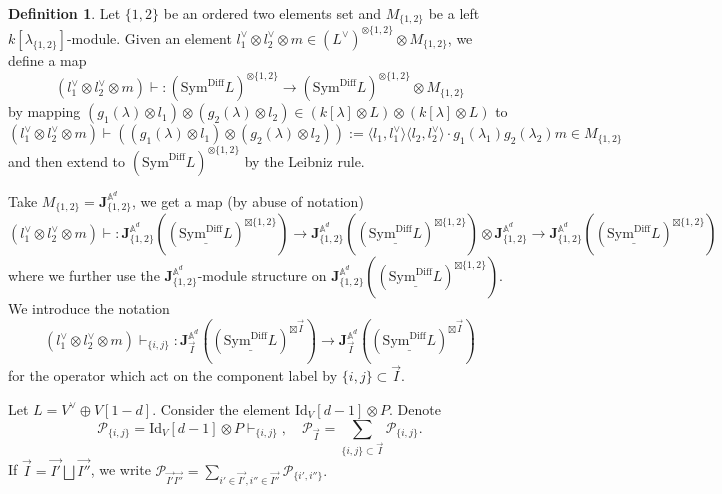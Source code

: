 \documentclass[11pt]{amsart}
\theoremstyle{definition}
\newtheorem{defn}[thm]{Definition}
\theoremstyle{remark}
\numberwithin{equation}{section}
\begin{document}
\begin{defn}{\label{WickContraction}}
Let $\{1,2\}$ be an ordered two elements set and $M_{\{1,2\}}$ be a left $k[\lambda_{\{1,2\}}]$-module. Given an element $l^{\vee}_1\otimes l^{\vee}_2\otimes m\in (L^{\vee})^{\otimes \{1,2\}}\otimes M_{\{1,2\}}$, we define a map
$$
\left(l^{\vee}_1\otimes l^{\vee}_2\otimes m\right)\vdash:\left(\mathrm{Sym}^{\mathrm{Diff}}L\right)^{\otimes \{1,2\}}\rightarrow \left(\mathrm{Sym}^{\mathrm{Diff}}L\right)^{\otimes \{1,2\}}\otimes M_{\{1,2\}}
$$
    by mapping $\left(g_1(\lambda)\otimes l_1\right)\otimes \left(g_2(\lambda)\otimes l_2\right)\in \left(k[\lambda]\otimes L\right)\otimes \left(k[\lambda]\otimes L\right)$ to
    $$
    \left(l^{\vee}_1\otimes l^{\vee}_2\otimes m\right)\vdash\left(
\left(g_1(\lambda)\otimes l_1\right)\otimes \left(g_2(\lambda)\otimes l_2\right)\right):=\langle l_1,l^{\vee}_1\rangle\langle l_2,l^{\vee}_2\rangle\cdot  g_1(\lambda_1)g_2(\lambda_2)m\in M_{\{1,2\}}
$$
and then extend to $\left(\mathrm{Sym}^{\mathrm{Diff}}L\right)^{\otimes \{1,2\}}$ by the Leibniz rule.

Take $M_{\{1,2\}}=\mathbf{J}^{\mathbb{A}^d}_{\{1,2\}}$, we get a map (by abuse of notation)
$$
\left(l^{\vee}_1\otimes l^{\vee}_2\otimes m\right)\vdash:\mathbf{J}^{\mathbb{A}^d}_{\{1,2\}}\left((\underline{\mathrm{Sym}^{\mathrm{Diff}}L})^{\boxtimes\{1,2\}} \right)\rightarrow \mathbf{J}^{\mathbb{A}^d}_{\{1,2\}}\left((\underline{\mathrm{Sym}^{\mathrm{Diff}}L})^{\boxtimes\{1,2\}} \right)\otimes \mathbf{J}^{\mathbb{A}^d}_{\{1,2\}}\rightarrow \mathbf{J}^{\mathbb{A}^d}_{\{1,2\}}\left((\underline{\mathrm{Sym}^{\mathrm{Diff}}L})^{\boxtimes\{1,2\}} \right)
$$
where we further use the $\mathbf{J}^{\mathbb{A}^d}_{\{1,2\}}$-module structure on $\mathbf{J}^{\mathbb{A}^d}_{\{1,2\}}\left((\underline{\mathrm{Sym}^{\mathrm{Diff}}L})^{\boxtimes\{1,2\}} \right)$.  We introduce the notation
$$
\left(l^{\vee}_1\otimes l^{\vee}_2\otimes m\right)\vdash_{\{i,j\}}:\mathbf{J}^{\mathbb{A}^d}_{\overrightarrow{I}}\left((\underline{\mathrm{Sym}^{\mathrm{Diff}}L})^{\boxtimes \overrightarrow{I}} \right)\rightarrow \mathbf{J}^{\mathbb{A}^d}_{\overrightarrow{I}}\left((\underline{\mathrm{Sym}^{\mathrm{Diff}}L})^{\boxtimes\overrightarrow{I}} \right)
$$
for the operator which act on the component label by $\{i,j\}\subset \overrightarrow{I}$.




\end{defn}

Let $L=V^{\vee}\oplus V[1-d]$. Consider the element $\mathrm{Id}_V[d-1]\otimes P$. Denote $$\mathcal{P}_{\{i,j\}}=\mathrm{Id}_V[d-1]\otimes P\vdash_{\{i,j\}},\quad \mathcal{P}_{\overrightarrow{I}}=\sum_{\{i,j\}\subset \overrightarrow{I}}\mathcal{P}_{\{i,j\}}.
$$
If $\overrightarrow{I}=\overrightarrow{I'}\bigsqcup \overrightarrow{I''}$, we write ${\mathcal{P}}_{\overrightarrow{I'}\overrightarrow{I''}}=\sum\limits_{i'\in \overrightarrow{I'}, i''\in\overrightarrow{I''} }\mathcal{P}_{\{i',i''\}}.$
\end{document}
